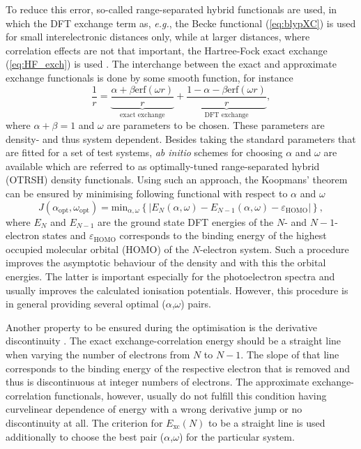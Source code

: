 To reduce this error, so-called range-separated hybrid functionals are used, in which the DFT exchange term as, \textit{e.g.}, the Becke functional (\ref{eq:blypXC}) is used for small interelectronic distances only, while at larger distances, where correlation effects are not that important, the Hartree-Fock exact exchange (\ref{eq:HF_exch}) is used \cite{LC-tddft}.
The interchange between the exact and approximate exchange functionals is done by some smooth function, for instance
\begin{equation}
   \frac 1r = \underbrace{\frac{\alpha +\beta \text{erf}(\omega r)}{r}}_{\text{exact exchange}} +\underbrace{\frac{1-\alpha-\beta \text{erf}(\omega r)}{r}}_{\text{DFT exchange}},
\end{equation}
where $\alpha+\beta=1$ and $\omega$ are parameters to be chosen.
These parameters are density- and thus system dependent.
Besides taking the standard parameters that are fitted for a set of test systems, \textit{ab initio} schemes for choosing $\alpha$ and $\omega$ are available which are referred to as optimally-tuned range-separated hybrid (OTRSH) density functionals.
Using such an approach, the Koopmans' theorem can be ensured by minimising following functional with respect to $\alpha$ and $\omega$ \cite{Bokareva}
\begin{equation}\label{eq:J_ao}
   J(\alpha_\text{opt},\omega_\text{opt})=\text{min}_{\alpha, \omega} \left\{ |E_N(\alpha,\omega)-E_{N-1}(\alpha,\omega)-\varepsilon_\text{HOMO}| \right\},
\end{equation}
where $E_N$ and $E_{N-1}$ are the ground state DFT energies of the $N$- and $N-1$-electron states and $\varepsilon_\text{HOMO}$ corresponds to the binding energy of the highest occupied molecular orbital (HOMO) of the $N$-electron system.
Such a procedure improves the asymptotic behaviour of the density and with this the orbital energies.
The latter is important especially for the photoelectron spectra and usually improves the calculated ionisation potentials.
However, this procedure is in general providing several optimal ($\alpha$,$\omega$) pairs.

Another property to be ensured during the optimisation is the derivative discontinuity \cite{derdis,sanchez,Autschbach}.
The exact exchange-correlation energy should be a straight line when varying the number of electrons from $N$ to $N-1$.
The slope of that line corresponds to the binding energy of the respective electron that is removed and thus is discontinuous at integer numbers of electrons.
The approximate exchange-correlation functionals, however, usually do not fulfill this condition having curvelinear dependence of energy with a wrong derivative jump or no discontinuity at all.
The criterion for $E_\text{xc}(N)$ to be a straight line is used additionally to choose the best pair ($\alpha$,$\omega$) for the particular system.

